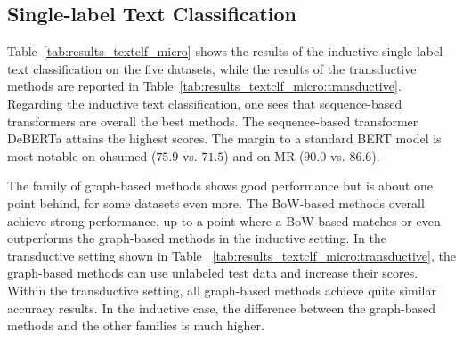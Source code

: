 \subsection{Single-label Text Classification}

\renewcommand{\mytextsubscript}[1]{{\color{black}~\textsubscript{#1}}}
\newcommand\mycaption{Results for the inductive training on the single-label
text classification datasets. For our experiments, we report the mean accuracy
and standard deviation (SD) over five runs. For numbers from the literature, we
report the SD if available. GPT-3 methods use 16 examples per class for
in-context learning, and the (R.S)-variant uses a RoBERTa sampler to select
these examples. Column ``Provenance'' reports the source. d.\,f. is short for the use of a different variant of the dataset or a different split, and thus, the number is omitted to ensure comparability.}
\newcommand\mylabel{\label{tab:results_textclf_micro}}


Table~\ref{tab:results_textclf_micro} shows the results of the inductive single-label text classification on the five datasets, while the results of the transductive methods are reported in Table~\ref{tab:results_textclf_micro:transductive}.
Regarding the inductive text classification, one sees that sequence-based transformers are overall the best methods.
The sequence-based transformer DeBERTa attains the highest scores. 
The margin to a standard BERT model is most notable on ohsumed ($75.9$ vs. $71.5$) and on MR ($90.0$ vs. $86.6$).

The family of graph-based methods shows good performance but is about one point behind, for some datasets even more.
The BoW-based methods overall achieve strong performance,
up to a point where a BoW-based \mlp matches or even outperforms the graph-based methods in the inductive setting.
In the transductive setting shown in Table~ \ref{tab:results_textclf_micro:transductive}, the graph-based methods can use unlabeled test data and increase their scores.
Within the transductive setting, all graph-based methods achieve quite similar accuracy results.
In the inductive case, the difference between the graph-based methods and the other families is much higher.

\renewcommand{\myheader}{
\caption{Results for the single-label text classification datasets.
    Note that only graph-based methods require the transductive setting.
    We report mean accuracy and standard deviation over five runs.
    The column ``Provenance'' reports the source.}\label{tab:results_textclf_micro:transductive}
 }


